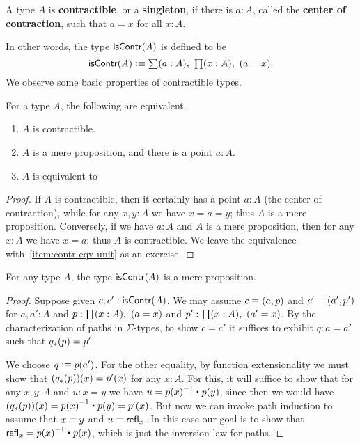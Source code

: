 \begin{defn}\label{defn:contractible}
  A type $A$ is \textbf{contractible}, or a \textbf{singleton}, if there is $a:A$, called the \textbf{center of contraction}, such that $a=x$ for all $x:A$.
\end{defn}

In other words, the type $\mathsf{isContr}(A)$ is defined to be
\[ \iscontr(A) \defeq \sm{a:A} \prd{x:A}(a=x). \]
We observe some basic properties of contractible types.

\begin{lem}\label{thm:contr-paths}
  For a type $A$, the following are equivalent.
  \begin{enumerate}
  \item $A$ is contractible.
  \item $A$ is a mere proposition, and there is a point $a:A$.\label{item:contr-inhabited-prop}
  \item $A$ is equivalent to \unit.\label{item:contr-eqv-unit}
  \end{enumerate}
\end{lem}
\begin{proof}
  If $A$ is contractible, then it certainly has a point $a:A$ (the center of contraction), while for any $x,y:A$ we have $x=a=y$; thus $A$ is a mere proposition.
  Conversely, if we have $a:A$ and $A$ is a mere proposition, then for any $x:A$ we have $x=a$; thus $A$ is contractible.
  We leave the equivalence with~\ref{item:contr-eqv-unit} as an exercise.
\end{proof}

\begin{lem}\label{thm:isprop-iscontr}
  For any type $A$, the type $\mathsf{isContr}(A)$ is a mere proposition.
\end{lem}
\begin{proof}
  Suppose given $c,c':\mathsf{isContr}(A)$.
  We may assume $c\equiv(a,p)$ and $c'\equiv(a',p')$ for $a,a':A$ and $p:\prd{x:A} (a=x)$ and $p':\prd{x:A} (a'=x)$.
  By the characterization of paths in $\Sigma$-types, to show $c=c'$ it suffices to exhibit $q:a=a'$ such that ${q}_{*}\!\left({p}\right)=p'$.

  We choose $q\vcentcolon\equiv p(a')$.
  For the other equality, by function extensionality we must show that $({q}_{*}\!\left({p}\right))(x)=p'(x)$ for any $x:A$.
  For this, it will suffice to show that for any $x,y:A$ and $u:x=y$ we have $u= \opp{p(x)} \ct p(y)$, since then we would have $(\trans q p)(x) = \opp{p(x)} \ct p(y) = p'(x)$.
  But now we can invoke path induction to assume that $x\equiv y$ and $u\equiv \mathsf{refl}_{x}$.
  In this case our goal is to show that $\refl x = \opp{p(x)} \ct p(x)$, which is just the inversion law for paths.
\end{proof}


